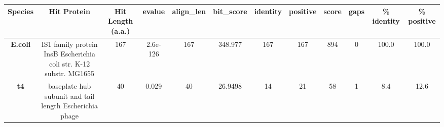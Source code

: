 \begin{tabular}{|c|c|c|c|c|c|c|c|c|c|c|c|} \hline
\textbf{Species} & \textbf{Hit Protein} & \textbf{Hit Length (a.a.)} & \textbf{evalue} & \textbf{align\_len} & \textbf{bit\_score} & \textbf{identity} & \textbf{positive} & \textbf{score} & \textbf{gaps} & \textbf{\% identity} & \textbf{\% positive} \\ \hline
\textbf{E.coli} & IS1 family protein InsB Escherichia coli str. K-12 substr. MG1655 & 167 & 2.6e-126 & 167 & 348.977 & 167 & 167 & 894 & 0 & 100.0 & 100.0\\
\textbf{t4} & baseplate hub subunit and tail length Escherichia phage  & 40 & 0.029 & 40 & 26.9498 & 14 & 21 & 58 & 1 & 8.4 & 12.6\\
\hline \end{tabular}
